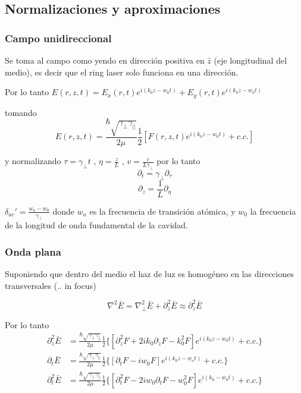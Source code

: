 		
				\subsection{Normalizaciones y aproximaciones}
				
				\subsubsection{Campo unidireccional}
				
				Se toma al campo como yendo en dirección positiva en $\hat{z}$ (eje longitudinal del medio), es decir que el ring laser solo funciona en una dirección.
				
				Por lo tanto  $E(r,z,t)=E_x(r,t) e^{i(k_0 z - w_0 t)} + E_y(r,t) e^{i(k_0 z - w_0 t)} $
				
				tomando \[E(r,z,t)=\frac{\hbar \sqrt{ \gamma_{\bot} \gamma_{||} }}{2\mu } \frac{1}{2} [F(r,z,t) e^{i(k_0 z - w_0 t)} + c.c.]  \]
				
				y normalizando $\tau=\gamma_{\bot} t$ , $\eta=\tfrac{z}{L}$ , $v=\frac{c}{L \gamma_{\bot}}$ por lo tanto 
				\[ \partial_t = \gamma_{\bot} \partial_{\tau} \]
				\[ \partial_z = \frac{1}{L} \partial_{\eta}  \]
				
				
				$\delta_{ac}'=\frac{w_a - w_0}{\gamma_{\bot}}$
				donde $w_a$ es la frecuencia de transición atómica, y $w_0$ la frecuencia de la longitud de onda fundamental de la cavidad.
				
				
				\subsubsection{Onda plana}
				
				Suponiendo que dentro del  medio el haz de luz es homogéneo en las direcciones transversales (.. in focus)
				
				\[ \nabla^2 \bar{E} = \nabla^2_{\bot}\bar{E} + \partial^2_z \bar{E} \approx \partial^2_z \bar{E} \]
				
				Por lo tanto 
				\begin{align*}
				\partial^2_z \bar{E} &= \frac{\hbar \sqrt{ \gamma_{\bot} \gamma_{||} }}{2\mu }\frac{1}{2} \{ [\partial^2_z F + 2i k_0 \partial_z F -k_0^2 F]e^{i(k_0 z - w_0 t)} + c.c.  \} \\  
				\partial_t \bar{E} &= \frac{\hbar \sqrt{ \gamma_{\bot} \gamma_{||} }}{2\mu }\frac{1}{2} \{ [\partial_t F - iw_0 F ] e^{i(k_0 z - w_o t)} + c.c. \}  \\
				\partial^2_t \bar{E} &= \frac{\hbar \sqrt{ \gamma_{\bot} \gamma_{||} }}{2\mu }\frac{1}{2} \{ [ \partial^2_t F -2iw_0 \partial_t F -w_0^2  F  ]e^{i(k_0-w_0t)} +c.c. \} 
				\end{align*}
				
